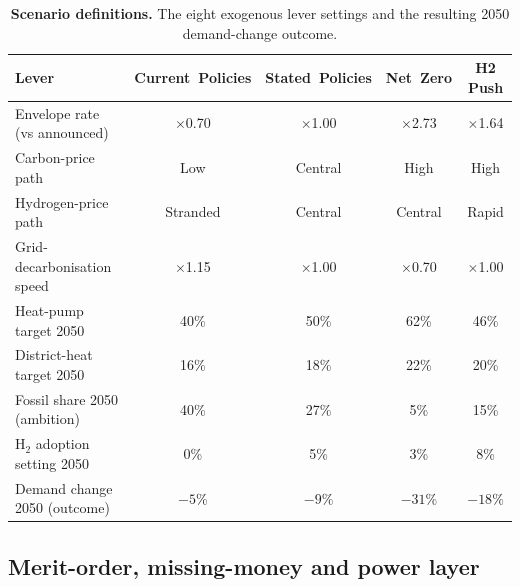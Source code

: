 \begin{table}[htbp]
\centering
\caption{\textbf{Scenario definitions.} The eight exogenous lever settings and the
 resulting 2050 demand-change outcome.}
\label{tab:scenarios}
\small
\begin{tabular}{lcccc}
\toprule
Lever & Current~Policies & Stated~Policies & Net~Zero & H2 Push \\
\midrule
Envelope rate (vs announced) & $\times$0.70 & $\times$1.00 & $\times$2.73 & $\times$1.64 \\
Carbon-price path & Low & Central & High & High \\
Hydrogen-price path & Stranded & Central & Central & Rapid \\
Grid-decarbonisation speed & $\times$1.15 & $\times$1.00 & $\times$0.70 & $\times$1.00 \\
Heat-pump target 2050 & 40\% & 50\% & 62\% & 46\% \\
District-heat target 2050 & 16\% & 18\% & 22\% & 20\% \\
Fossil share 2050 (ambition) & 40\% & 27\% & 5\% & 15\% \\
H$_2$ adoption setting 2050 & 0\% & 5\% & 3\% & 8\% \\
\midrule
Demand change 2050 (outcome) & $-5\%$ & $-9\%$ & $-31\%$ & $-18\%$ \\
\bottomrule
\end{tabular}
\par{}
\end{table}

\subsection{Merit-order, missing-money and power layer}
\label{sec:method:power}

